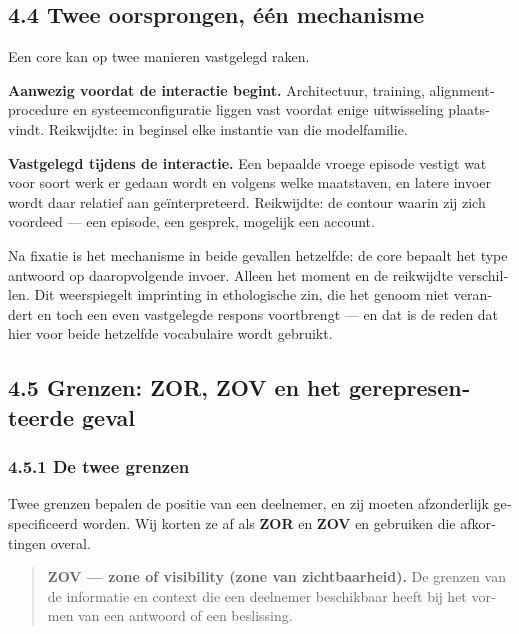 \begin{dutch}
\subsection*{4.4 Twee oorsprongen, één mechanisme}
\label{sec:nl:4.4}

Een core kan op twee manieren vastgelegd raken.

\textbf{Aanwezig voordat de interactie begint.} Architectuur, training, alignmentprocedure en systeemconfiguratie liggen vast voordat enige uitwisseling plaatsvindt. Reikwijdte: in beginsel elke instantie van die modelfamilie.

\textbf{Vastgelegd tijdens de interactie.} Een bepaalde vroege episode vestigt wat voor soort werk er gedaan wordt en volgens welke maatstaven, en latere invoer wordt daar relatief aan geïnterpreteerd. Reikwijdte: de contour waarin zij zich voordeed — een episode, een gesprek, mogelijk een account.

Na fixatie is het mechanisme in beide gevallen hetzelfde: de core bepaalt het type antwoord op daaropvolgende invoer. Alleen het moment en de reikwijdte verschillen. Dit weerspiegelt imprinting in ethologische zin, die het genoom niet verandert en toch een even vastgelegde respons voortbrengt — en dat is de reden dat hier voor beide hetzelfde vocabulaire wordt gebruikt.


\subsection*{4.5 Grenzen: ZOR, ZOV en het gerepresenteerde geval}
\label{sec:nl:4.5}


\subsubsection*{4.5.1 De twee grenzen}
\label{sec:nl:4.5.1}

Twee grenzen bepalen de positie van een deelnemer, en zij moeten afzonderlijk gespecificeerd worden. Wij korten ze af als \textbf{ZOR} en \textbf{ZOV} en gebruiken die afkortingen overal.

\begin{quote}
\textbf{ZOV — zone of visibility (zone van zichtbaarheid).} De grenzen van de informatie en context die een deelnemer beschikbaar heeft bij het vormen van een antwoord of een beslissing.


\end{quote}
\end{dutch}
